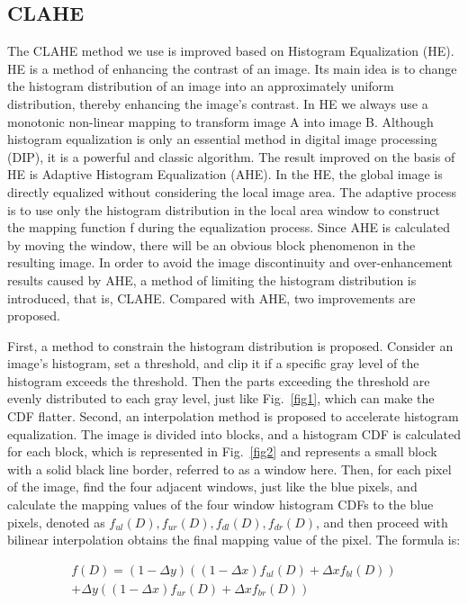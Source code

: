 \documentclass[conference]{IEEEtran}
\begin{document}
\subsection{CLAHE}
The CLAHE method we use is improved based on Histogram Equalization (HE). HE is a method of enhancing the contrast of an image. Its main idea is to change the histogram distribution of an image into an approximately uniform distribution, thereby enhancing the image's contrast. In HE we always use a monotonic non-linear mapping to transform image A into image B. Although histogram equalization is only an essential method in digital image processing (DIP), it is a powerful and classic algorithm. The result improved on the basis of HE is Adaptive Histogram Equalization (AHE). In the HE, the global image is directly equalized without considering the local image area. The adaptive process is to use only the histogram distribution in the local area window to construct the mapping function f during the equalization process. Since AHE is calculated by moving the window, there will be an obvious block phenomenon in the resulting image. In order to avoid the image discontinuity and over-enhancement results caused by AHE, a method of limiting the histogram distribution is introduced, that is, CLAHE. Compared with AHE, two improvements are proposed.

First, a method to constrain the histogram distribution is proposed. Consider an image's histogram, set a threshold, and clip it if a specific gray level of the histogram exceeds the threshold. Then the parts exceeding the threshold are evenly distributed to each gray level, just like Fig.~\ref{fig1}, which can make the CDF flatter. Second, an interpolation method is proposed to accelerate histogram equalization. The image is divided into blocks, and a histogram CDF is calculated for each block, which is represented in Fig.~\ref{fig2} and represents a small block with a solid black line border, referred to as a window here. Then, for each pixel of the image, find the four adjacent windows, just like the blue pixels, and calculate the mapping values of the four window histogram CDFs to the blue pixels, denoted as $f_{ul}(D),f_{ur}(D),f_{dl}(D),f_{dr}(D)$, and then proceed with bilinear interpolation obtains the final mapping value of the pixel. The formula is:

\begin{equation}
\begin{split}
f(D) = (1 - \Delta y)((1-\Delta x)f_{ul}(D) + \Delta x f_{bl}(D) )  \\
+ \Delta y ((1-\Delta x)f_{ur}(D) + \Delta x f_{br}(D))
\end{split}
\label{eq12}
\end{equation}
\end{document}
